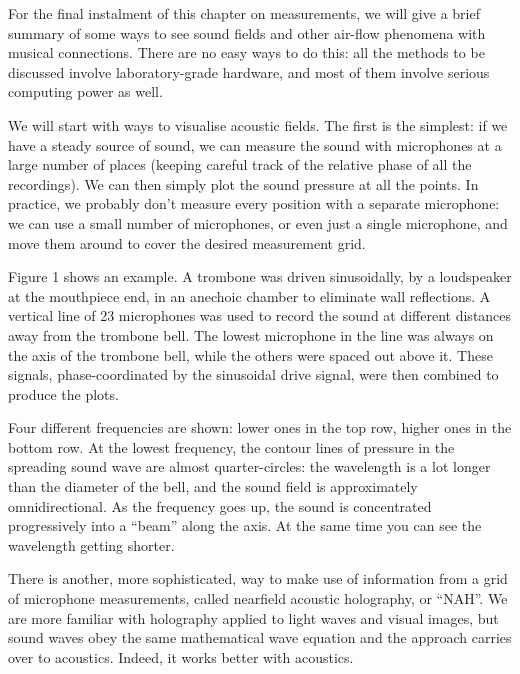 

  For the final instalment of this chapter on measurements, we will give a 
  brief summary of some ways to see sound fields and other air-flow phenomena 
  with musical connections. There are no easy ways to do this: all the methods 
  to be discussed involve laboratory-grade hardware, and most of them involve 
  serious computing power as well. 

  We will start with ways to visualise acoustic fields. The first is the 
  simplest: if we have a steady source of sound, we can measure the sound with 
  microphones at a large number of places (keeping careful track of the 
  relative phase of all the recordings). We can then simply plot the sound 
  pressure at all the points. In practice, we probably don’t measure every 
  position with a separate microphone: we can use a small number of 
  microphones, or even just a single microphone, and move them around to cover 
  the desired measurement grid. 

  Figure 1 shows an example. A trombone was driven sinusoidally, by a 
  loudspeaker at the mouthpiece end, in an anechoic chamber to eliminate wall 
  reflections. A vertical line of 23 microphones was used to record the sound 
  at different distances away from the trombone bell. The lowest microphone in 
  the line was always on the axis of the trombone bell, while the others were 
  spaced out above it. These signals, phase-coordinated by the sinusoidal drive 
  signal, were then combined to produce the plots. 





  Four different frequencies are shown: lower ones in the top row, higher ones 
  in the bottom row. At the lowest frequency, the contour lines of pressure in 
  the spreading sound wave are almost quarter-circles: the wavelength is a lot 
  longer than the diameter of the bell, and the sound field is approximately 
  omnidirectional. As the frequency goes up, the sound is concentrated 
  progressively into a “beam” along the axis. At the same time you can see the 
  wavelength getting shorter. 

  There is another, more sophisticated, way to make use of information from a 
  grid of microphone measurements, called nearfield acoustic holography, or 
  “NAH”. We are more familiar with holography applied to light waves and visual 
  images, but sound waves obey the same mathematical wave equation and the 
  approach carries over to acoustics. Indeed, it works better with acoustics. 


